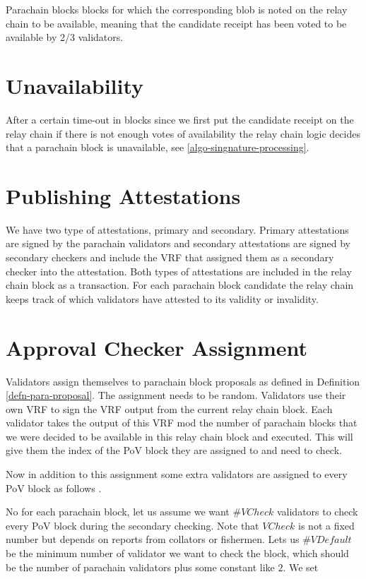 \begin{definition}
  \label{defn-available-parablock-proposal}
        Parachain blocks blocks for which the corresponding blob is  noted on the relay chain to be available, meaning that the candidate receipt has been voted to be available by 2/3 validators.
\end{definition}

\section{Unavailability}
\label{sect-unavailability}
After a certain time-out in blocks since we first put the candidate receipt on the relay chain if there is not enough votes of availability the relay chain logic decides that a parachain block is unavailable, see \ref{algo-singnature-processing}. 

\section{Publishing Attestations}
\label{sect-publishing-attestations}
We have two type of attestations, primary and secondary. Primary attestations are signed by the parachain validators and secondary attestations are signed by secondary checkers and include the VRF that assigned them as a secondary checker into the attestation. Both types of attestations are included in the relay chain block as a transaction. For each parachain block candidate the relay chain keeps track of which validators have attested to its validity or invalidity. 

\section{Approval Checker Assignment}
\label{sect-shot-assignment}

Validators assign themselves to parachain block proposals as defined in Definition \ref{defn-para-proposal}. The assignment needs to be random. Validators use their own VRF to sign the VRF output from the current relay chain block. Each validator takes the output of this VRF mod the number of parachain blocks that we were decided to be available in this relay chain block and executed. This will give them the index of the PoV block they are assigned to and need to check.

Now in addition to this assignment some extra validators are assigned to every PoV block as follows .

No for each parachain block, let us assume we want $\#VCheck$ validators to check every PoV block during the secondary checking. Note that $VCheck$ is not a fixed number but depends on reports from collators or fishermen. Lets us $\#VDefault$ be the minimum number of validator we want to check the block, which should be the number of parachain validators plus some constant like $2$.  We set

